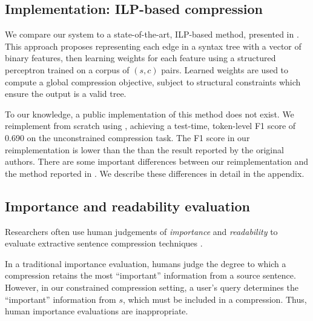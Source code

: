 \documentclass[11pt,a4paper]{article}
\begin{document}

\subsection{Implementation: ILP-based compression}\label{s:ilp}

We compare our system to a state-of-the-art, ILP-based method, presented in \citet{filippova2013overcoming}. This approach proposes representing each edge in a syntax tree with a vector of binary features, then learning weights for each feature using a structured perceptron trained on a corpus of $(s,c)$ pairs. Learned weights are used to compute a global compression objective, subject to structural constraints which ensure the output is a valid tree.

To our knowledge, a public implementation of this method does not exist. We reimplement from scratch using \citet{gurobi}, achieving a test-time, token-level F1 score of  0.690 on the unconstrained compression task. The F1 score in our reimplementation is lower than the than the result reported by the original authors. There are some important differences between our reimplementation and the method reported in \citet{filippova2013overcoming}. We describe these differences in detail in the appendix.

\subsection{Importance and readability evaluation}\label{s:readabilityinformativeness}

Researchers often use human judgements of \textit{importance} and \textit{readability} to evaluate extractive sentence compression techniques \cite{Knight2000StatisticsBasedS,clarke2008global,filippova2015sentence}. 

In a traditional importance evaluation, humans judge the degree to which a compression retains the most ``important'' information from a source sentence. However, in our constrained compression setting, a user's query determines the ``important'' information from $s$, which must be included in a compression. Thus, human importance evaluations are inappropriate.
 
\end{document}
